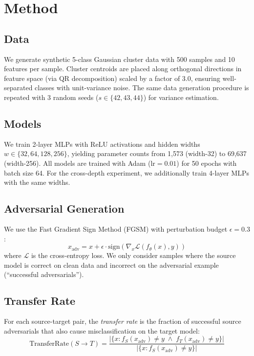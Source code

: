 \documentclass[11pt,a4paper]{article}
\begin{document}
\section{Method}

\subsection{Data}
We generate synthetic 5-class Gaussian cluster data with 500 samples and 10 features per sample. Cluster centroids are placed along orthogonal directions in feature space (via QR decomposition) scaled by a factor of 3.0, ensuring well-separated classes with unit-variance noise. The same data generation procedure is repeated with 3 random seeds ($s \in \{42, 43, 44\}$) for variance estimation.

\subsection{Models}
We train 2-layer MLPs with ReLU activations and hidden widths $w \in \{32, 64, 128, 256\}$, yielding parameter counts from 1{,}573 (width-32) to 69{,}637 (width-256). All models are trained with Adam (lr${}=0.01$) for 50 epochs with batch size 64. For the cross-depth experiment, we additionally train 4-layer MLPs with the same widths.

\subsection{Adversarial Generation}
We use the Fast Gradient Sign Method (FGSM) \citep{goodfellow2015explaining} with perturbation budget $\epsilon = 0.3$:
\begin{equation}
  x_{\text{adv}} = x + \epsilon \cdot \text{sign}\!\left(\nabla_x \mathcal{L}(f_\theta(x), y)\right)
\end{equation}
where $\mathcal{L}$ is the cross-entropy loss. We only consider samples where the source model is correct on clean data and incorrect on the adversarial example (``successful adversarials'').

\subsection{Transfer Rate}
For each source-target pair, the \emph{transfer rate} is the fraction of successful source adversarials that also cause misclassification on the target model:
\begin{equation}
  \text{TransferRate}(S \to T) = \frac{|\{x : f_S(x_{\text{adv}}) \neq y \;\wedge\; f_T(x_{\text{adv}}) \neq y\}|}{|\{x : f_S(x_{\text{adv}}) \neq y\}|}
\end{equation}
\end{document}
